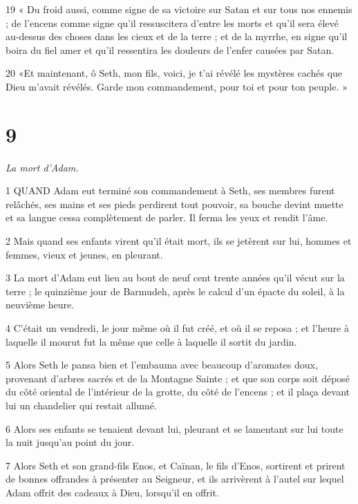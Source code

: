 \par 19 « Du froid aussi, comme signe de sa victoire sur Satan et sur tous nos ennemis ; de l'encens comme signe qu'il ressuscitera d'entre les morts et qu'il sera élevé au-dessus des choses dans les cieux et de la terre ; et de la myrrhe, en signe qu'il boira du fiel amer et qu'il ressentira les douleurs de l'enfer causées par Satan.

\par 20 «Et maintenant, ô Seth, mon fils, voici, je t'ai révélé les mystères cachés que Dieu m'avait révélés. Garde mon commandement, pour toi et pour ton peuple. »

\chapter{9}

\par \textit{La mort d'Adam.}

\par 1 QUAND Adam eut terminé son commandement à Seth, ses membres furent relâchés, ses mains et ses pieds perdirent tout pouvoir, sa bouche devint muette et sa langue cessa complètement de parler. Il ferma les yeux et rendit l'âme.

\par 2 Mais quand ses enfants virent qu'il était mort, ils se jetèrent sur lui, hommes et femmes, vieux et jeunes, en pleurant.

\par 3 La mort d'Adam eut lieu au bout de neuf cent trente années qu'il vécut sur la terre ; le quinzième jour de Barmudeh, après le calcul d'un épacte du soleil, à la neuvième heure.

\par 4 C'était un vendredi, le jour même où il fut créé, et où il se reposa ; et l'heure à laquelle il mourut fut la même que celle à laquelle il sortit du jardin.

\par 5 Alors Seth le pansa bien et l'embauma avec beaucoup d'aromates doux, provenant d'arbres sacrés et de la Montagne Sainte ; et que son corps soit déposé du côté oriental de l'intérieur de la grotte, du côté de l'encens ; et il plaça devant lui un chandelier qui restait allumé.

\par 6 Alors ses enfants se tenaient devant lui, pleurant et se lamentant sur lui toute la nuit jusqu'au point du jour.

\par 7 Alors Seth et son grand-fils Enos, et Caïnan, le fils d'Enos, sortirent et prirent de bonnes offrandes à présenter au Seigneur, et ils arrivèrent à l'autel sur lequel Adam offrit des cadeaux à Dieu, lorsqu'il en offrit.

